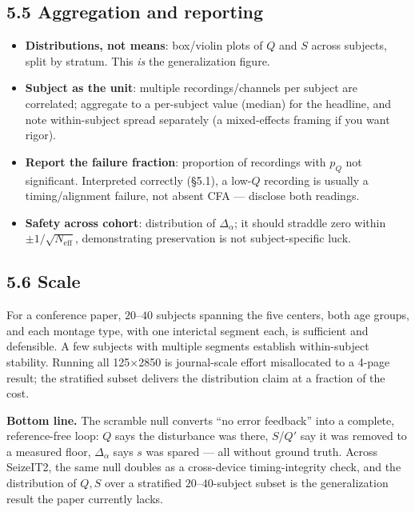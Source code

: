 \documentclass[11pt]{article}
\newcommand{\Neff}{N_{\mathrm{eff}}}
\begin{document}
\subsection*{5.5 Aggregation and reporting}
\begin{itemize}[leftmargin=1.4em,itemsep=2pt]
\item \textbf{Distributions, not means}: box/violin plots of $Q$ and $S$ across subjects, split by
stratum. This \emph{is} the generalization figure.
\item \textbf{Subject as the unit}: multiple recordings/channels per subject are correlated;
aggregate to a per-subject value (median) for the headline, and note within-subject spread
separately (a mixed-effects framing if you want rigor).
\item \textbf{Report the failure fraction}: proportion of recordings with $p_Q$ not significant.
Interpreted correctly (\S5.1), a low-$Q$ recording is usually a timing/alignment failure, not
absent CFA --- disclose both readings.
\item \textbf{Safety across cohort}: distribution of $\Delta_\alpha$; it should straddle zero
within $\pm1/\sqrt{\Neff}$, demonstrating preservation is not subject-specific luck.
\end{itemize}

\subsection*{5.6 Scale}
For a conference paper, $20$--$40$ subjects spanning the five centers, both age groups, and each
montage type, with one interictal segment each, is sufficient and defensible. A few subjects with
multiple segments establish within-subject stability. Running all 125$\times$2850 is journal-scale
effort misallocated to a 4-page result; the stratified subset delivers the distribution claim at a
fraction of the cost.

\vspace{0.5em}
\noindent\textbf{Bottom line.} The scramble null converts ``no error feedback'' into a complete,
reference-free loop: $Q$ says the disturbance was there, $S$/$Q'$ say it was removed to a measured
floor, $\Delta_\alpha$ says $s$ was spared --- all without ground truth. Across SeizeIT2, the same
null doubles as a cross-device timing-integrity check, and the distribution of $Q,S$ over a
stratified $20$--$40$-subject subset is the generalization result the paper currently lacks.
\end{document}
